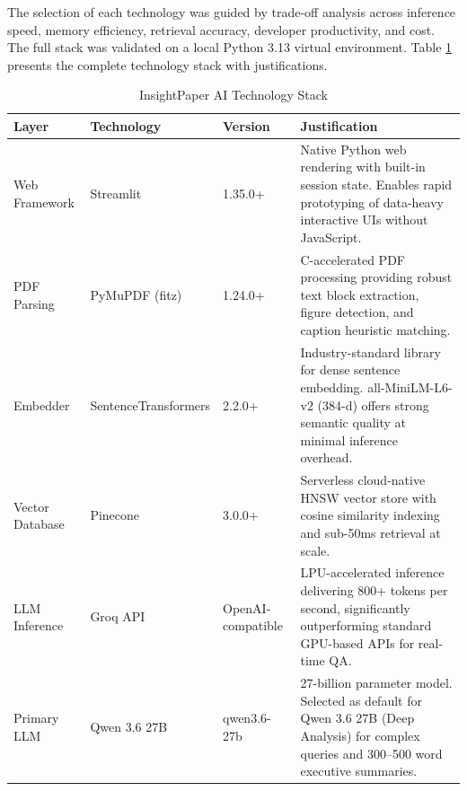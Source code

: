 The selection of each technology was guided by trade-off analysis across inference speed, memory efficiency, retrieval accuracy, developer productivity, and cost. The full stack was validated on a local Python 3.13 virtual environment. Table \ref{tab:stack} presents the complete technology stack with justifications.

\begin{table}[H]

\centering

\caption{InsightPaper AI Technology Stack}

\label{tab:stack}

\begin{tabular}{|p{2.5cm}|p{2.5cm}|p{1.5cm}|p{6cm}|}

\hline

\textbf{Layer} & \textbf{Technology} & \textbf{Version} & \textbf{Justification} \\

\hline

Web Framework & Streamlit & 1.35.0+ & Native Python web rendering with built-in session state. Enables rapid prototyping of data-heavy interactive UIs without JavaScript. \\

\hline

PDF Parsing & PyMuPDF (fitz) & 1.24.0+ & C-accelerated PDF processing providing robust text block extraction, figure detection, and caption heuristic matching. \\

\hline

Embedder & SentenceTransformers & 2.2.0+ & Industry-standard library for dense sentence embedding. all-MiniLM-L6-v2 (384-d) offers strong semantic quality at minimal inference overhead. \\

\hline

Vector Database & Pinecone & 3.0.0+ & Serverless cloud-native HNSW vector store with cosine similarity indexing and sub-50ms retrieval at scale. \\

\hline

LLM Inference & Groq API & OpenAI-compatible & LPU-accelerated inference delivering 800+ tokens per second, significantly outperforming standard GPU-based APIs for real-time QA. \\

\hline

Primary LLM & Qwen 3.6 27B & qwen3.6-27b & 27-billion parameter model. Selected as default for Qwen 3.6 27B (Deep Analysis) for complex queries and 300–500 word executive summaries. \\


\end{tabular}
\end{table}
